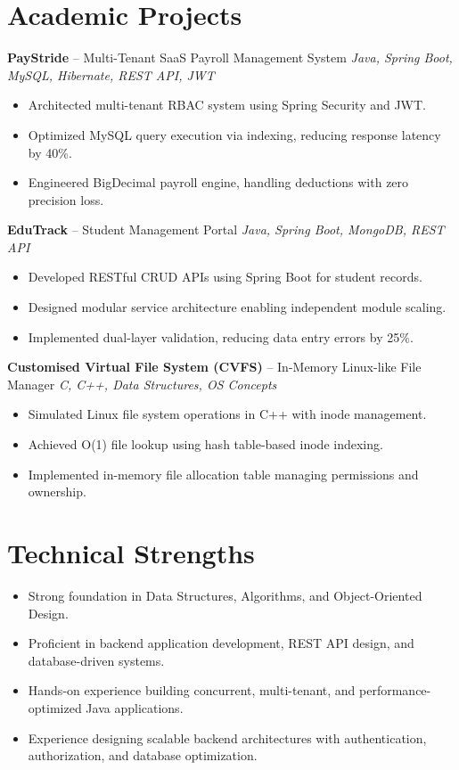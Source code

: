 \documentclass[10.5pt,a4paper]{article}
\begin{document}
\section{Academic Projects}
\textbf{PayStride} -- Multi-Tenant SaaS Payroll Management System \hfill \textit{Java, Spring Boot, MySQL, Hibernate, REST API, JWT}
\begin{itemize}
  \item Architected multi-tenant RBAC system using Spring Security and JWT.
  \item Optimized MySQL query execution via indexing, reducing response latency by 40\%.
  \item Engineered BigDecimal payroll engine, handling deductions with zero precision loss.
\end{itemize}
\vspace{4pt}
\textbf{EduTrack} -- Student Management Portal \hfill \textit{Java, Spring Boot, MongoDB, REST API}
\begin{itemize}
  \item Developed RESTful CRUD APIs using Spring Boot for student records.
  \item Designed modular service architecture enabling independent module scaling.
  \item Implemented dual-layer validation, reducing data entry errors by 25\%.
\end{itemize}
\vspace{4pt}
\textbf{Customised Virtual File System (CVFS)} -- In-Memory Linux-like File Manager \hfill \textit{C, C++, Data Structures, OS Concepts}
\begin{itemize}
  \item Simulated Linux file system operations in C++ with inode management.
  \item Achieved O(1) file lookup using hash table-based inode indexing.
  \item Implemented in-memory file allocation table managing permissions and ownership.
\end{itemize}
\section{Technical Strengths}
\begin{itemize}
  \item Strong foundation in Data Structures, Algorithms, and Object-Oriented Design.
  \item Proficient in backend application development, REST API design, and database-driven systems.
  \item Hands-on experience building concurrent, multi-tenant, and performance-optimized Java applications.
  \item Experience designing scalable backend architectures with authentication, authorization, and database optimization.
\end{itemize}
\end{document}
